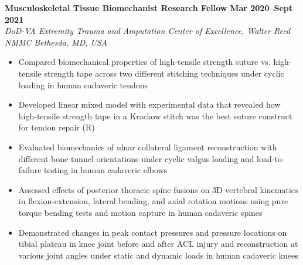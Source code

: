 \documentclass[10pt]{letter}
\begin{document}
\textbf{Musculoskeletal Tissue Biomechanist Research Fellow}
\hfill
\textbf{Mar 2020--Sept 2021} \\
\textit{DoD-VA Extremity Trauma and Amputation Center of Excellence, Walter Reed NMMC}
\hfill
\textit{Bethesda, MD, USA} \\
\vspace{2pt}
{\small
\begin{itemize}
    \item Compared biomechanical properties of high-tensile strength suture vs. high-tensile strength tape across two different stitching techniques under cyclic loading in human cadaveric tendons
    \item Developed linear mixed model with experimental data that revealed how high-tensile strength tape in a Krackow stitch was the best suture construct for tendon repair (R)
    \item Evaluated biomechanics of ulnar collateral ligament reconstruction with different bone tunnel orientations under cyclic valgus loading and load-to-failure testing in human cadaveric elbows
    \item Assessed effects of posterior thoracic spine fusions on 3D vertebral kinematics in flexion-extension, lateral bending, and axial rotation motions using pure torque bending tests and motion capture in human cadaveric spines
    \item Demonstrated changes in peak contact pressures and pressure locations on tibial plateau in knee joint before and after ACL injury and reconstruction at various joint angles under static and dynamic loads in human cadaveric knees
\end{itemize}}
\vspace{10pt}
\end{document}
